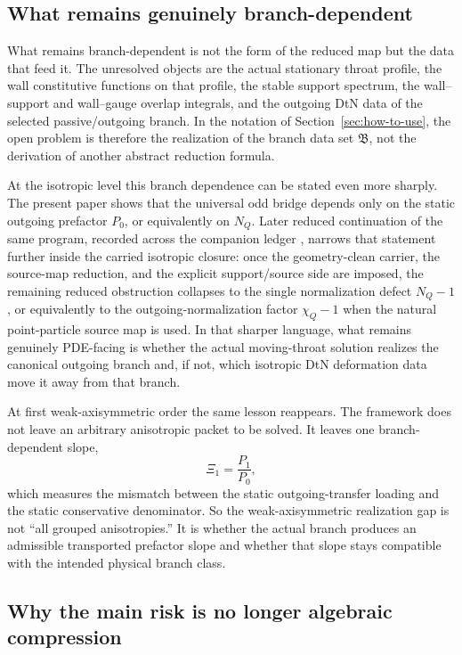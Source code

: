 \documentclass[11pt]{article}
\theoremstyle{definition}
\newcommand{\XiOne}{\ensuremath{\Xi_1}}
\begin{document}
\subsection{What remains genuinely branch-dependent}

What remains branch-dependent is not the form of the reduced map but the data that feed it. The unresolved objects are the actual stationary throat profile, the wall constitutive functions on that profile, the stable support spectrum, the wall--support and wall--gauge overlap integrals, and the outgoing DtN data of the selected passive/outgoing branch. In the notation of Section~\ref{sec:how-to-use}, the open problem is therefore the realization of the branch data set \(\mathfrak B\), not the derivation of another abstract reduction formula.

At the isotropic level this branch dependence can be stated even more sharply. The present paper shows that the universal odd bridge depends only on the static outgoing prefactor \(P_0\), or equivalently on \(N_Q\). Later reduced continuation of the same program, recorded across the companion ledger \cite{Norris2026PDELedger}, narrows that statement further inside the carried isotropic closure: once the geometry-clean carrier, the source-map reduction, and the explicit support/source side are imposed, the remaining reduced obstruction collapses to the single normalization defect \(N_Q-1\), or equivalently to the outgoing-normalization factor \(\chi_Q-1\) when the natural point-particle source map is used. In that sharper language, what remains genuinely PDE-facing is whether the actual moving-throat solution realizes the canonical outgoing branch and, if not, which isotropic DtN deformation data move it away from that branch.

At first weak-axisymmetric order the same lesson reappears. The framework does not leave an arbitrary anisotropic packet to be solved. It leaves one branch-dependent slope,
\[
\XiOne=\frac{P_1}{P_0},
\]
which measures the mismatch between the static outgoing-transfer loading and the static conservative denominator. So the weak-axisymmetric realization gap is not ``all grouped anisotropies.'' It is whether the actual branch produces an admissible transported prefactor slope and whether that slope stays compatible with the intended physical branch class.

\subsection{Why the main risk is no longer algebraic compression}
\end{document}
